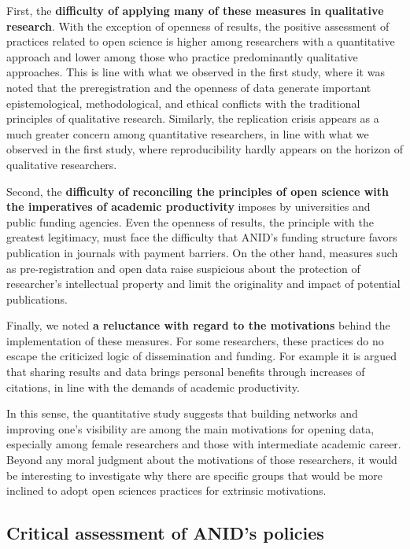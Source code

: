 \documentclass[
  letterpaper,
]{article}
\begin{document}
First, the \textbf{difficulty of applying many of these measures in
qualitative research}. With the exception of openness of results, the
positive assessment of practices related to open science is higher among
researchers with a quantitative approach and lower among those who
practice predominantly qualitative approaches. This is line with what we
observed in the first study, where it was noted that the preregistration
and the openness of data generate important epistemological,
methodological, and ethical conflicts with the traditional principles of
qualitative research. Similarly, the replication crisis appears as a
much greater concern among quantitative researchers, in line with what
we observed in the first study, where reproducibility hardly appears on
the horizon of qualitative researchers.

Second, the \textbf{difficulty of reconciling the principles of open
science with the imperatives of academic productivity} imposes by
universities and public funding agencies. Even the openness of results,
the principle with the greatest legitimacy, must face the difficulty
that ANID's funding structure favors publication in journals with
payment barriers. On the other hand, measures such as pre-registration
and open data raise suspicious about the protection of researcher's
intellectual property and limit the originality and impact of potential
publications.

Finally, we noted \textbf{a reluctance with regard to the motivations}
behind the implementation of these measures. For some researchers, these
practices do no escape the criticized logic of dissemination and
funding. For example it is argued that sharing results and data brings
personal benefits through increases of citations, in line with the
demands of academic productivity.

In this sense, the quantitative study suggests that building networks
and improving one's visibility are among the main motivations for
opening data, especially among female researchers and those with
intermediate academic career. Beyond any moral judgment about the
motivations of those researchers, it would be interesting to investigate
why there are specific groups that would be more inclined to adopt open
sciences practices for extrinsic motivations.

\subsection{Critical assessment of ANID's
policies}\label{critical-assessment-of-anids-policies}
\end{document}
